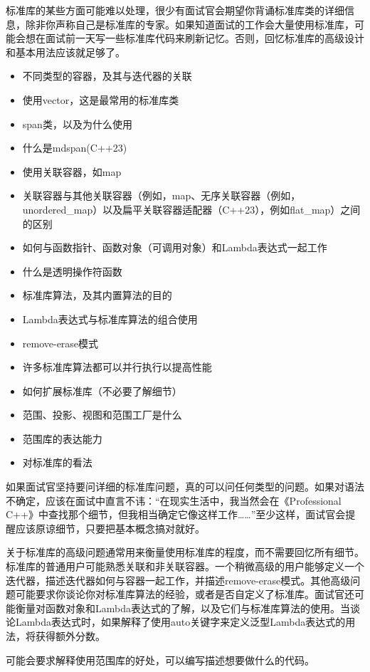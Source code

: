 
标准库的某些方面可能难以处理，很少有面试官会期望你背诵标准库类的详细信息，除非你声称自己是标准库的专家。如果知道面试的工作会大量使用标准库，可能会想在面试前一天写一些标准库代码来刷新记忆。否则，回忆标准库的高级设计和基本用法应该就足够了。


\begin{itemize}
\item
不同类型的容器，及其与迭代器的关联

\item
使用vector，这是最常用的标准库类

\item
span类，以及为什么使用

\item
什么是mdspan(C++23)

\item
使用关联容器，如map

\item
关联容器与其他关联容器（例如，map、无序关联容器（例如，unordered\_map）以及扁平关联容器适配器（C++23），例如flat\_map）之间的区别

\item
如何与函数指针、函数对象（可调用对象）和Lambda表达式一起工作

\item
什么是透明操作符函数

\item
标准库算法，及其内置算法的目的

\item
Lambda表达式与标准库算法的组合使用

\item
remove-erase模式

\item
许多标准库算法都可以并行执行以提高性能

\item
如何扩展标准库（不必要了解细节）

\item
范围、投影、视图和范围工厂是什么

\item
范围库的表达能力

\item
对标准库的看法
\end{itemize}


如果面试官坚持要问详细的标准库问题，真的可以问任何类型的问题。如果对语法不确定，应该在面试中直言不讳：“在现实生活中，我当然会在《Professional C++》中查找那个细节，但我相当确定它像这样工作……”至少这样，面试官会提醒应该原谅细节，只要把基本概念搞对就好。

关于标准库的高级问题通常用来衡量使用标准库的程度，而不需要回忆所有细节。标准库的普通用户可能熟悉关联和非关联容器。一个稍微高级的用户能够定义一个迭代器，描述迭代器如何与容器一起工作，并描述remove-erase模式。其他高级问题可能要求你谈论你对标准库算法的经验，或者是否自定义了标准库。面试官还可能衡量对函数对象和Lambda表达式的了解，以及它们与标准库算法的使用。当谈论Lambda表达式时，如果解释了使用auto关键字来定义泛型Lambda表达式的用法，将获得额外分数。

可能会要求解释使用范围库的好处，可以编写描述想要做什么的代码。













